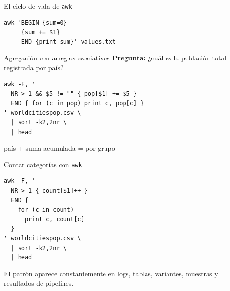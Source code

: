 \documentclass[aspectratio=169,11pt]{beamer}
\begin{document}
\begin{frame}[fragile]{El ciclo de vida de \texttt{awk}}
  \centering
\begin{lstlisting}
awk 'BEGIN {sum=0}
     {sum += $1}
     END {print sum}' values.txt
\end{lstlisting}
\end{frame}

\begin{frame}[fragile]{Agregación con arreglos asociativos}
  \textbf{Pregunta:} ¿cuál es la población total registrada por país?
\begin{lstlisting}
awk -F, '
  NR > 1 && $5 != "" { pop[$1] += $5 }
  END { for (c in pop) print c, pop[c] }
' worldcitiespop.csv \
  | sort -k2,2nr \
  | head
\end{lstlisting}
  \vspace{3mm}
  \; país \quad + \quad {}\; suma acumulada \quad = \quad {}\; por grupo
\end{frame}

\begin{frame}[fragile]{Contar categorías con \texttt{awk}}
\begin{lstlisting}
awk -F, '
  NR > 1 { count[$1]++ }
  END {
    for (c in count)
      print c, count[c]
  }
' worldcitiespop.csv \
  | sort -k2,2nr \
  | head
\end{lstlisting}
  \vspace{4mm}
  \small\color{Slate}El patrón  aparece constantemente en logs, tablas, variantes, muestras y resultados de pipelines.
\end{frame}
\end{document}

